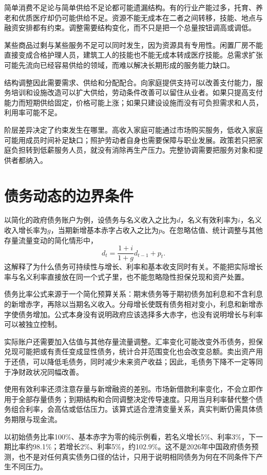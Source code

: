 \documentclass[UTF8,fontset=fandol,zihao=-4,oneside,openany]{ctexbook}
\begin{document}
简单消费不足论与简单供给不足论都可能遗漏结构。有的行业产能过多，托育、养老和优质医疗却仍可能供给不足。资源不能无成本在二者之间转移，技能、地点与融资安排都有约束。调整需要结构变化，而不只是把一个总量按钮调高或调低。

\label{arg:P231}
某些商品过剩与某些服务不足可以同时发生，因为资源具有专用性。闲置厂房不能直接变成合格护理人员，建筑工人的技能也不能无成本转成医疗技能。总需求扩张可能先流向已经容易供给的领域，而难以解决长期形成的服务能力缺口。

结构调整因此需要需求、供给和分配配合。向家庭提供支持可以改善支付能力，服务培训和设施改造可以扩大供给，劳动条件改善可以留住从业者。如果只提高支付能力而短期供给固定，价格可能上涨；如果只建设设施而没有可负担需求和人员，利用率可能不足。

阶层差异决定了约束发生在哪里。高收入家庭可能通过市场购买服务，低收入家庭可能用成员时间补足缺口；照护劳动者自身也需要保障与职业发展。政策若只把家庭负担转到低薪服务人员，就没有消除再生产压力。完整协调需要把服务对象和提供者都纳入。

\section{债务动态的边界条件}
以简化的政府债务账户为例，设债务与名义收入之比为$d$，名义有效利率为$i$，名义收入增长率为$g$，当期新增基本赤字占收入之比为$p$。在忽略估值、统计调整与其他存量流量变动的简化情形中，
\[
d_t=\frac{1+i}{1+g}d_{t-1}+p_t.
\]
这解释了为什么债务可持续性与增长、利率和基本收支同时有关。不能把实际增长率与名义利率直接放在同一个式子里，也不能忽略隐性担保兑现和资产处置。

\label{arg:P232}
债务比率公式来源于一个简化预算关系：期末债务等于期初债务加利息和不含利息的新增赤字，再除以当期名义收入。分母增长使既有债务相对变小，利息和新增赤字使债务增加。公式本身没有说明政府应该选择多大赤字，也没有说明增长与利率可以被独立控制。

实际账户还需要加入估值与其他存量流量调整。汇率变化可能改变外币债务，担保兑现可能把或有责任变成显性债务，统计合并范围变化也会改变总额。卖出资产用于还债，可以降低毛债务，同时减少未来资产收益；因此，毛债务下降不一定等同于净财政状况同幅改善。

使用有效利率还须注意存量与新增融资的差别。市场新借款利率变化，不会立即作用于全部存量债务；到期结构和合同调整决定传导速度。只用当月利率替代整个债务组合利率，会高估或低估压力。该算式适合澄清变量关系，真实判断仍需具体债务期限与现金流。

以初始债务比率100\%、基本赤字为零的纯示例看，若名义增长5\%、利率3\%，下一期比率约98.1\%；若增长2\%、利率5\%，约102.9\%。这不是2026年中国政府债务预测，也不是对任何真实债务口径的估计，只用于说明相同债务为何在不同条件下产生不同压力。
\end{document}
